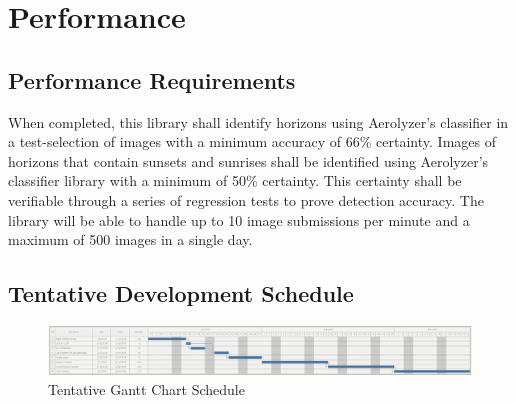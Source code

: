 \documentclass[journal,10pt,draftclsnofoot,onecolumn]{IEEEtran}
\begin{document}
\begin{singlespace}
\clearpage

\section{Performance}
	\subsection{Performance Requirements}
		When completed, this library shall identify horizons using Aerolyzer's classifier in a test-selection of images with a minimum accuracy of 66\% certainty.
		Images of horizons that contain sunsets and sunrises shall be identified using Aerolyzer's classifier library with a minimum of 50\% certainty.
		This certainty shall be verifiable through a series of regression tests to prove detection accuracy.
		The library will be able to handle up to 10 image submissions per minute and a maximum of 500 images in a single day.

	\begin{landscape}
		\section{Tentative Development Schedule}
		\begin{figure}[h]
			\includegraphics[width=9.5in]{gantt.png}
			\caption{Tentative Gantt Chart Schedule}
		    \label{fig:Tentative Schedule}
	    \end{figure}
	\end{landscape}

\end{singlespace}
\end{document}
